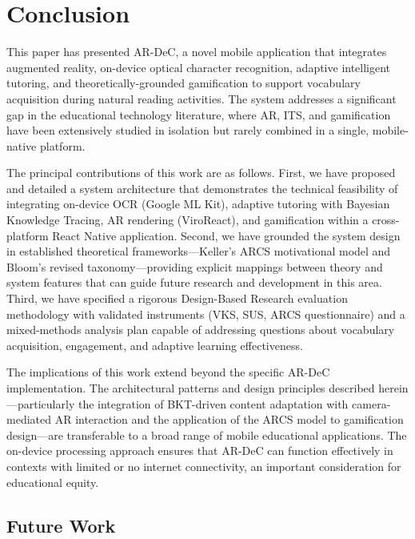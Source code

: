 
\section{Conclusion}
\label{sec:conclusion}

This paper has presented AR-DeC, a novel mobile application that integrates augmented reality, on-device optical character recognition, adaptive intelligent tutoring, and theoretically-grounded gamification to support vocabulary acquisition during natural reading activities. The system addresses a significant gap in the educational technology literature, where AR, ITS, and gamification have been extensively studied in isolation but rarely combined in a single, mobile-native platform.

The principal contributions of this work are as follows. First, we have proposed and detailed a system architecture that demonstrates the technical feasibility of integrating on-device OCR (Google ML Kit), adaptive tutoring with Bayesian Knowledge Tracing, AR rendering (ViroReact), and gamification within a cross-platform React Native application. Second, we have grounded the system design in established theoretical frameworks---Keller's ARCS motivational model and Bloom's revised taxonomy---providing explicit mappings between theory and system features that can guide future research and development in this area. Third, we have specified a rigorous Design-Based Research evaluation methodology with validated instruments (VKS, SUS, ARCS questionnaire) and a mixed-methods analysis plan capable of addressing questions about vocabulary acquisition, engagement, and adaptive learning effectiveness.

The implications of this work extend beyond the specific AR-DeC implementation. The architectural patterns and design principles described herein---particularly the integration of BKT-driven content adaptation with camera-mediated AR interaction and the application of the ARCS model to gamification design---are transferable to a broad range of mobile educational applications. The on-device processing approach ensures that AR-DeC can function effectively in contexts with limited or no internet connectivity, an important consideration for educational equity.

\subsection{Future Work}
\label{subsec:future_work}

